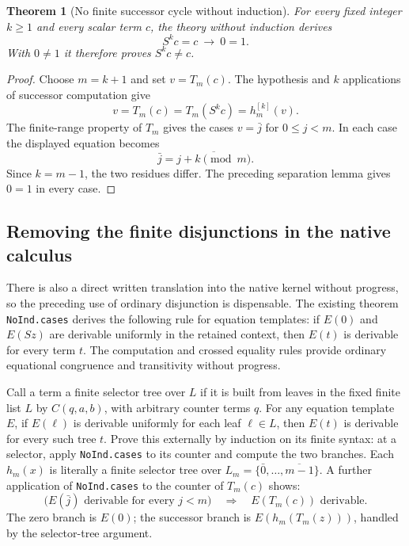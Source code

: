 \documentclass[11pt,letterpaper]{article}
\newtheorem{theorem}{Theorem}[section]
\theoremstyle{definition}
\begin{document}
\begin{theorem}[No finite successor cycle without induction]
For every fixed integer $k\geq1$ and every scalar term $c$, the theory
without induction derives
\[
 S^k c=c\ \longrightarrow\ 0=1.
\]
With $0\ne1$ it therefore proves $S^k c\ne c$.
\end{theorem}
\begin{proof}
Choose $m=k+1$ and set $v=T_m(c)$. The hypothesis and $k$ applications of
successor computation give
\[
 v=T_m(c)=T_m(S^k c)=h_m^{[k]}(v).
\]
The finite-range property of $T_m$ gives the cases $v=\bar j$ for
$0\leq j<m$. In each case the displayed equation becomes
\[
 \bar j=\overline{j+k\pmod m}.
\]
Since $k=m-1$, the two residues differ. The preceding separation lemma
gives $0=1$ in every case.
\end{proof}

\subsection{Removing the finite disjunctions in the native calculus}

There is also a direct written translation into the native kernel without
progress, so the preceding use of ordinary disjunction is dispensable.
The existing theorem \texttt{NoInd.cases} derives the following rule for
equation templates: if $E(0)$ and $E(Sz)$ are derivable uniformly in the
retained context, then $E(t)$ is derivable for every term $t$. The
computation and crossed equality rules provide ordinary equational
congruence and transitivity without progress.

Call a term a finite selector tree over $L$ if it is built from leaves in
the fixed finite list $L$ by $C(q,a,b)$, with arbitrary counter terms $q$.
For any equation template $E$, if $E(\ell)$ is derivable uniformly for
each leaf $\ell\in L$, then $E(t)$ is derivable for every such tree $t$.
Prove this externally by induction on its finite syntax: at a selector,
apply \texttt{NoInd.cases} to its counter and compute the two branches.
Each $h_m(x)$ is literally a finite selector tree over
$L_m=\{\bar0,\ldots,\overline{m-1}\}$. A further application of
\texttt{NoInd.cases} to the counter of $T_m(c)$ shows:
\[
 \bigl(E(\bar j)\text{ derivable for every }j<m\bigr)
 \quad\Longrightarrow\quad E(T_m(c))\text{ derivable}.
 \tag{FR}
\]
The zero branch is $E(0)$; the successor branch is
$E(h_m(T_m(z)))$, handled by the selector-tree argument.
\end{document}
